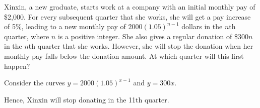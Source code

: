 \begin{problem}
    Xinxin, a new graduate, starts work at a company with an initial monthly pay of \$2,000. For every subsequent quarter that she works, she will get a pay increase of 5\%, leading to a new monthly pay of $2000(1.05)^{n-1}$ dollars in the $n$th quarter, where $n$ is a positive integer. She also gives a regular donation of \$$300n$ in the $n$th quarter that she works. However, she will stop the donation when her monthly pay falls below the donation amount. At which quarter will this first happen?
\end{problem}
\begin{solution}
    Consider the curves $y = 2000(1.05)^{x-1}$ and $y=300x$.

    \begin{center}
    \end{center}
    Hence, Xinxin will stop donating in the 11th quarter.
\end{solution}